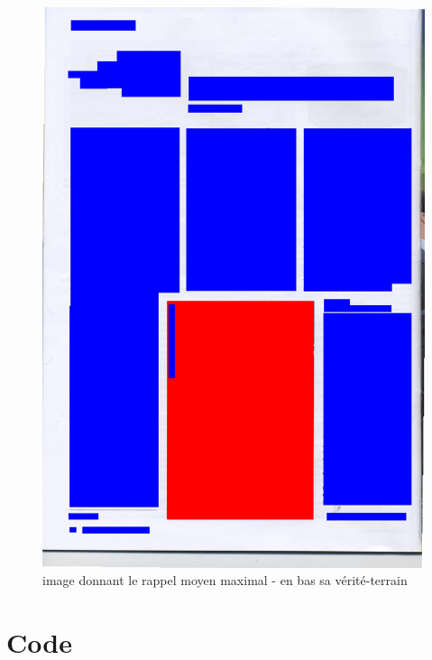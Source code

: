 \documentclass{book}
\begin{document}
\begin{figure}[H]
\begin{center}
\includegraphics[scale=0.25]{images/50_m.jpg}
\end{center}
\caption{image donnant le rappel moyen maximal - en bas sa vérité-terrain}
\label{meilleur_rappel}
\end{figure}

\clearpage

\chapter{Code}
\end{document}
